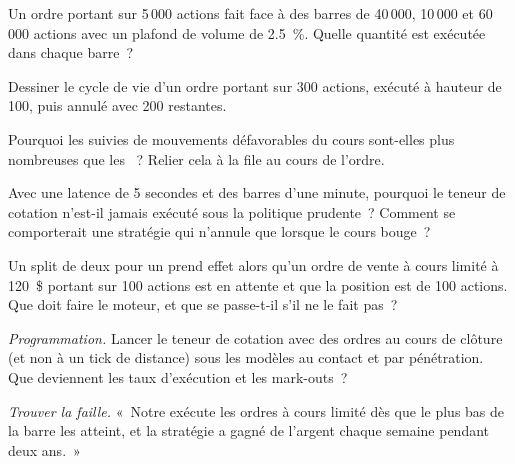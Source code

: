\begin{exercise}[$\star$]\label{exo:rs:event-driven-backtests:2}
Un ordre portant sur 5\,000 actions fait face à des barres de 40\,000, 10\,000 et 60\,000 actions avec un plafond de volume de 2.5~\%. Quelle quantité est exécutée dans chaque barre~?
\end{exercise}

\begin{exercise}[$\star$]\label{exo:rs:event-driven-backtests:3}
Dessiner le cycle de vie d'un ordre portant sur 300 actions, exécuté à hauteur de 100, puis annulé avec 200 restantes.
\end{exercise}

\begin{exercise}[$\star\star$]\label{exo:rs:event-driven-backtests:4}
Pourquoi les  suivies de mouvements défavorables du cours sont-elles plus nombreuses que les ~? Relier cela à la file au cours de l'ordre.
\end{exercise}

\begin{exercise}[$\star\star$]\label{exo:rs:event-driven-backtests:5}
Avec une latence de 5 secondes et des barres d'une minute, pourquoi le teneur de cotation n'est-il jamais exécuté sous la politique prudente~? Comment se comporterait une stratégie qui n'annule que lorsque
le cours bouge~?
\end{exercise}

\begin{exercise}[$\star\star$]\label{exo:rs:event-driven-backtests:6}
Un split de deux pour un prend effet alors qu'un ordre de vente à cours limité à 120~\$ portant sur 100 actions est en attente et que la position est de 100 actions. Que doit faire le moteur, et que
se passe-t-il s'il ne le fait pas~?
\end{exercise}

\begin{exercise}[$\star\star\star$]\label{exo:rs:event-driven-backtests:7}
\emph{Programmation.} Lancer le teneur de cotation avec des ordres au cours de clôture (et non à un tick de distance) sous les modèles au contact et par pénétration. Que deviennent les taux d'exécution et
les mark-outs~?
\end{exercise}

\begin{exercise}[$\star\star\star$]\label{exo:rs:event-driven-backtests:8}
\emph{Trouver la faille.} «~Notre  exécute les ordres à cours limité dès que le plus bas de la barre les atteint, et la stratégie a gagné de l'argent chaque semaine pendant deux ans.~»
\end{exercise}


